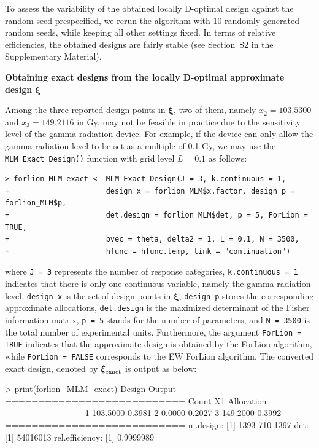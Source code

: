 To assess the variability of the obtained locally D-optimal design against the random seed prespecified, we rerun the algorithm with 10 randomly generated random seeds, while keeping all other settings fixed. In terms of relative efficiencies, the obtained designs are fairly stable (see Section~S2 in the Supplementary Material).

\medskip
\noindent
{\bf Obtaining exact designs from the locally D-optimal approximate design $\boldsymbol{\xi}$}
\smallskip

\noindent
Among the three reported design points in $\boldsymbol{\xi}$, two of them, namely $x_2=103.5300$ and $x_3 = 149.2116$ in Gy, may not be feasible in practice due to the sensitivity level of the gamma radiation device. For example, if the device can only allow the gamma radiation level to be set as a multiple of 0.1 Gy, we may use the {\tt MLM\_Exact\_Design()} function with grid level $L=0.1$ as follows:
\begin{Verbatim}
> forlion_MLM_exact <- MLM_Exact_Design(J = 3, k.continuous = 1, 
+                      design_x = forlion_MLM$x.factor, design_p = forlion_MLM$p,
+                      det.design = forlion_MLM$det, p = 5, ForLion = TRUE, 
+                      bvec = theta, delta2 = 1, L = 0.1, N = 3500,
+                      hfunc = hfunc.temp, link = "continuation")
\end{Verbatim}
where {\tt J = 3} represents the number of response categories, \verb|k.continuous = 1| indicates that there is only one continuous variable, namely   the gamma radiation level, \verb|design_x| is the set of design points in $\boldsymbol{\xi}$, \verb|design_p| stores the corresponding approximate allocations, \verb|det.design| is the maximized determinant of the Fisher information matrix, {\tt p = 5} stands for the number of parameters, and {\tt N = 3500} is the total number of experimental units. 
Furthermore, the argument {\tt ForLion = TRUE} indicates that the approximate design is obtained by the ForLion algorithm, while  \verb|ForLion = FALSE| corresponds to the EW ForLion algorithm. 
The converted exact design, denoted by $\boldsymbol{\xi}_{\rm exact}$ is output as below: 
\begin{example}
> print(forlion_MLM_exact)
Design Output
=========================== 
Count  X1        Allocation
--------------------------- 
1      103.5000  0.3981
2        0.0000  0.2027
3      149.2000  0.3992
=========================== 
ni.design:
[1] 1393  710 1397
det:
[1] 54016013
rel.efficiency:
[1] 0.9999989
\end{example}

